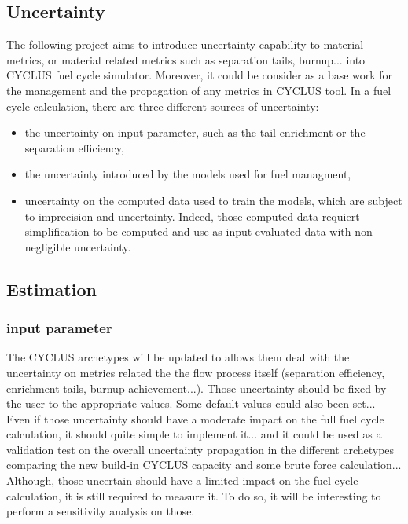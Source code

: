 \documentclass[dvips,12pt]{article}
\begin{document}
\subsection{Uncertainty}
The following project aims to introduce uncertainty capability to material metrics, or material related metrics such as separation tails, burnup...  into CYCLUS fuel cycle simulator. Moreover, it could be consider as a base work for the management and the propagation of any metrics in CYCLUS tool.
In a fuel cycle calculation, there are three different sources of uncertainty:
\begin{itemize}
\item the uncertainty on input parameter, such as the tail enrichment or the separation efficiency,
\item the uncertainty introduced by the models used for fuel managment,
\item uncertainty on the computed data used to train the models, which are subject to imprecision and uncertainty. Indeed, those computed data requiert simplification to be computed and use as input evaluated data with non negligible uncertainty.
\end{itemize}



\subsection{Estimation}
\subsubsection{input parameter}
The CYCLUS archetypes will be updated to allows them deal with the uncertainty on metrics related the the flow process itself (separation efficiency, enrichment tails, burnup achievement...). Those uncertainty should be fixed by the user to the appropriate values. Some default values could also been set...\\
Even if those uncertainty should have a moderate impact on the full fuel cycle calculation, it should quite simple to implement it... and it could be used as a validation test on the overall uncertainty propagation in the different archetypes comparing the new build-in CYCLUS capacity and some brute force calculation...\\
Although, those uncertain should have a limited impact on the fuel cycle calculation, it is still required to measure it. To do so, it will be interesting to perform a sensitivity analysis on those.
\end{document}
